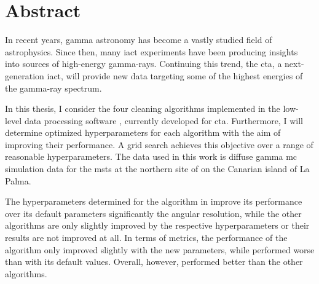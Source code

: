 \thispagestyle{plain}

\section*{Abstract}
In recent years, gamma astronomy has become a vastly studied field of astrophysics.
Since then, many \gls{iact} experiments have been producing insights into sources of
high-energy gamma-rays. Continuing this trend, the \gls{cta}, a next-generation \gls{iact},
will provide new data targeting some of the highest energies of the gamma-ray spectrum.

In this thesis, I consider the four cleaning algorithms implemented in the low-level data processing software \ctapipe{},
currently developed for \gls{cta}. Furthermore, I will determine optimized hyperparameters for each algorithm
with the aim of improving their performance. A grid search achieves this objective
over a range of reasonable hyperparameters. The data used in this work is diffuse gamma \gls{mc} simulation data for
the \glspl{mst} at the northern site of \cta{} on the Canarian island of La Palma.

The hyperparameters determined for the \tcc{} algorithm in \ctapipe{} improve its performance over
its default parameters significantly \wrt the angular resolution, while the other algorithms are only
slightly improved by the respective hyperparameters or their results are not improved at all.
In terms of metrics, the performance of the \tcc{} algorithm only improved slightly with the new parameters, while \fact{}
performed worse than with its default values. Overall, however, \fact{} performed better than the other
algorithms.



